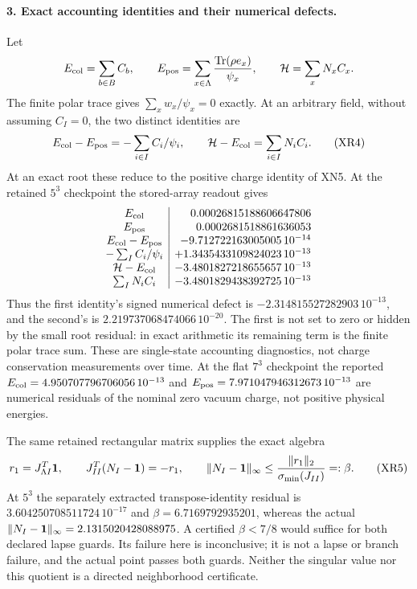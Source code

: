 \documentclass[11pt]{article}
\DeclareMathOperator{\Tr}{Tr}
\begin{document}
\paragraph{3. Exact accounting identities and their numerical defects.}
Let
\[
 E_{\rm col}=\sum_{b\in B}C_b,\qquad
 E_{\rm pos}=\sum_{x\in\Lambda}\frac{\Tr(\rho e_x)}{\psi_x},
 \qquad {\cal H}=\sum_xN_xC_x .
\]
The finite polar trace gives $\sum_xw_x/\psi_x=0$ exactly.
At an arbitrary field, without assuming $C_I=0$, the two
distinct identities are
\begin{equation}
 E_{\rm col}-E_{\rm pos}=-\sum_{i\in I}C_i/\psi_i,\qquad
 {\cal H}-E_{\rm col}=\sum_{i\in I}N_iC_i .
 \tag{XR4}
\end{equation}
At an exact root these reduce to the positive charge identity
of XN5.  At the retained $5^3$ checkpoint the stored-array
readout gives
\[
\begin{array}{c|r}
 E_{\rm col}&0.00026815188606647806\\
 E_{\rm pos}&0.0002681518861636053\\
 E_{\rm col}-E_{\rm pos}&-9.712722163005005\,10^{-14}\\
 -\sum_I C_i/\psi_i&+1.3435433109824023\,10^{-13}\\
 {\cal H}-E_{\rm col}&-3.4801827218655657\,10^{-13}\\
 \sum_I N_iC_i&-3.4801829438392725\,10^{-13}
\end{array}
\]
Thus the first identity's signed numerical defect is
$-2.314815527282903\,10^{-13}$, and the second's is
$2.219737068474066\,10^{-20}$.  The first is not set to zero
or hidden by the small root residual: in exact arithmetic its
remaining term is the finite polar trace sum.  These are
single-state accounting diagnostics, not charge conservation
measurements over time.
At the flat $7^3$ checkpoint the reported
$E_{\rm col}=4.950707796706056\,10^{-13}$ and
$E_{\rm pos}=7.971047946312673\,10^{-13}$ are numerical
residuals of the nominal zero vacuum charge, not positive
physical energies.

The same retained rectangular matrix supplies the exact algebra
\begin{equation}
 r_1=J_{\Lambda I}^{T}{\bf1},\qquad
 J_{II}^{T}(N_I-{\bf1})=-r_1,\qquad
 \|N_I-{\bf1}\|_\infty
       \leq\frac{\|r_1\|_2}{\sigma_{\min}(J_{II})}
       =:\beta .
 \tag{XR5}
\end{equation}
At $5^3$ the separately extracted transpose-identity residual
is $3.604250708511724\,10^{-17}$ and
$\beta=6.7169792935201$, whereas the actual
$\|N_I-{\bf1}\|_\infty=2.1315020428088975$.
A certified $\beta<7/8$ would suffice for both declared lapse
guards.  Its failure here is inconclusive; it is not a lapse
or branch failure, and the actual point passes both guards.
Neither the singular value nor this quotient is a directed
neighborhood certificate.
\end{document}
